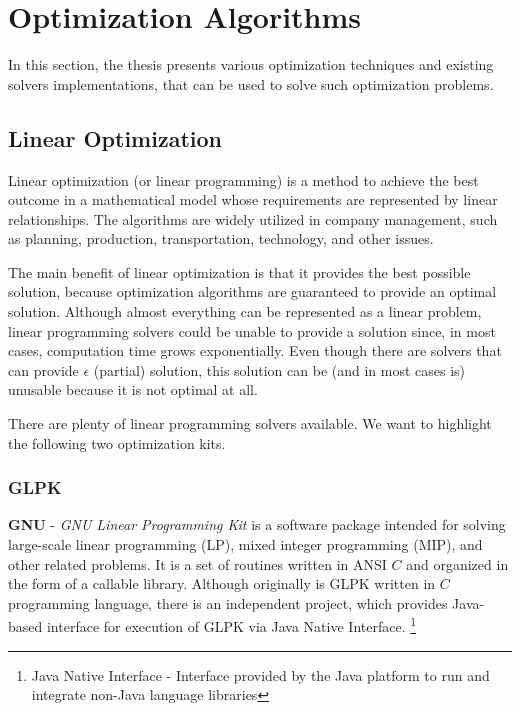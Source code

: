 \section{Optimization Algorithms}\label{sec:optimization-algorithms}

In this section, the thesis presents various optimization techniques 
and existing solvers implementations, 
that can be used to solve such optimization problems.

\subsection{Linear Optimization}\label{subsec:linear-optimization}
Linear optimization (or linear programming) is a method to achieve the best outcome in a mathematical model
whose requirements are represented by linear relationships.
The algorithms are widely utilized in company management, such as planning, production, transportation, technology, and other issues.

The main benefit of linear optimization is that it provides the best possible solution,
because optimization algorithms are guaranteed to provide an optimal solution.
Although almost everything can be represented as a linear problem,
linear programming solvers could be unable to provide a solution since, in most cases, computation time grows exponentially.
Even though there are solvers that can provide $\epsilon$ (partial) solution,
this solution can be (and in most cases is) unusable because it is not optimal at all.

\medskip
\noindent There are plenty of linear programming solvers available.
We want to highlight the following two optimization kits.

\subsubsection{GLPK}\label{subsubsec:glpk}
\textbf{GNU} - \textit{GNU Linear Programming Kit} is a software package intended for solving large-scale linear programming (LP),
mixed integer programming (MIP), and other related problems.
It is a set of routines written in ANSI $C$ and organized in the form of a callable library\cite{web:gnuGlpk}.
Although originally is GLPK written in $C$ programming language,
there is an independent project,
which provides Java-based interface for execution of GLPK via Java Native Interface.
\footnote{Java Native Interface - Interface provided by the Java platform to run and integrate non-Java language libraries}

